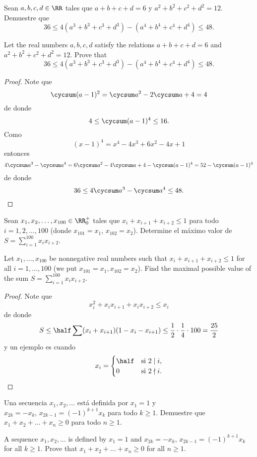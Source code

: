 \begin{probEB}[ISL 2010/A2]
	Sean $a,b,c,d\in\RR$ tales que $a+b+c+d=6$ y $a^2+b^2+c^2+d^2=12$. Demuestre que
	\[36\le 4(a^3+b^3+c^3+d^3)-(a^4+b^4+c^4+d^4)\le 48.\]
	\begin{hint}
		Let the real numbers $a,b,c,d$ satisfy the relations $a+b+c+d=6$ and $a^2+b^2+c^2+d^2=12$. Prove that
		\[36\le 4(a^3+b^3+c^3+d^3)-(a^4+b^4+c^4+d^4)\le 48.\]
	\end{hint}
\end{probEB}

\begin{proof}
	Note que
	\[\cycsum(a-1)^2=\cycsum a^2-2\cycsum a+4=4\]
	de donde
	\[4\le\cycsum(a-1)^4\le 16.\]
	Como
	\[(x-1)^4=x^4-4x^3+6x^2-4x+1\]
	entonces
	\[4\cycsum a^3-\cycsum a^4=6\cycsum a^2-4\cycsum a+4-\cycsum(a-1)^4=52-\cycsum(a-1)^4\]
	de donde
	\[36\le 4\cycsum a^3-\cycsum a^4\le 48.\]
\end{proof}

\begin{probMG}[ISL 2010/A3]
	Sean $x_1,x_2,\dots,x_{100}\in\RR_0^+$ tales que $x_i+x_{i+1}+x_{i+2}\le 1$ para todo $i=1,2,\dots,100$ (donde $x_{101}=x_1$, $x_{102}=x_2$). Determine el máximo valor de $S=\sum_{i=1}^{100}x_ix_{i+2}$.
	\begin{hint}
		Let $x_1,\dots,x_{100}$ be nonnegative real numbers such that $x_i+x_{i+1}+x_{i+2}\le 1$ for all $i=1,\dots,100$ (we put $x_{101}=x_1,x_{102}=x_2$). Find the maximal possible value of the sum $S=\sum^{100}_{i=1}x_ix_{i+2}$.
	\end{hint}
\end{probMG}

\begin{proof}
	Note que
	\[x_i^2+x_ix_{i+1}+x_ix_{i+2}\le x_i\]
	de donde
	\[S\le\half\sum(x_i+x_{i+1})(1-x_i-x_{i+1})\le\frac12\cdot\frac14\cdot 100=\frac{25}{2}\]
	y un ejemplo es cuando
	\[x_i=\begin{cases}
		\half&\text{si }2\mid i,\\
		0&\text{si }2\nmid i.
	\end{cases}\]
\end{proof}

\begin{probEG}[ISL 2010/A4]
	Una secuencia $x_1,x_2,\dots$ está definida por $x_1=1$ y $x_{2k}=-x_k,\,x_{2k-1}=(-1)^{k+1}x_k$ para todo $k\ge 1$. Demuestre que $x_1+x_2+\dots+x_n\ge 0$ para todo $n\ge 1$.
	\begin{hint}
		A sequence $x_1,x_2,\dots$ is defined by $x_1=1$ and $x_{2k}=-x_k,\,x_{2k-1}=(-1)^{k+1}x_k$ for all $k\ge 1$. Prove that $x_1+x_2+\dots+x_n\ge 0$ for all $n\ge 1$.
	\end{hint}
\end{probEG}

